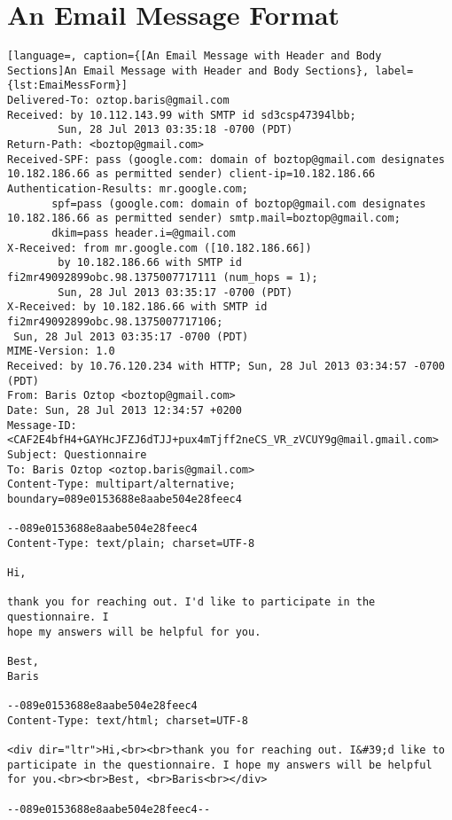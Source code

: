 \chapter{An Email Message Format}
\label{app:EmaiMessForm}

\textbf{}


\begin{lstlisting}[language=, caption={[An Email Message with Header and Body Sections]An Email Message with Header and Body Sections}, label={lst:EmaiMessForm}]
Delivered-To: oztop.baris@gmail.com
Received: by 10.112.143.99 with SMTP id sd3csp47394lbb;
        Sun, 28 Jul 2013 03:35:18 -0700 (PDT)
Return-Path: <boztop@gmail.com>
Received-SPF: pass (google.com: domain of boztop@gmail.com designates 10.182.186.66 as permitted sender) client-ip=10.182.186.66
Authentication-Results: mr.google.com;
       spf=pass (google.com: domain of boztop@gmail.com designates 10.182.186.66 as permitted sender) smtp.mail=boztop@gmail.com;
       dkim=pass header.i=@gmail.com
X-Received: from mr.google.com ([10.182.186.66])
        by 10.182.186.66 with SMTP id fi2mr49092899obc.98.1375007717111 (num_hops = 1);
        Sun, 28 Jul 2013 03:35:17 -0700 (PDT)
X-Received: by 10.182.186.66 with SMTP id fi2mr49092899obc.98.1375007717106;
 Sun, 28 Jul 2013 03:35:17 -0700 (PDT)
MIME-Version: 1.0
Received: by 10.76.120.234 with HTTP; Sun, 28 Jul 2013 03:34:57 -0700 (PDT)
From: Baris Oztop <boztop@gmail.com>
Date: Sun, 28 Jul 2013 12:34:57 +0200
Message-ID: <CAF2E4bfH4+GAYHcJFZJ6dTJJ+pux4mTjff2neCS_VR_zVCUY9g@mail.gmail.com>
Subject: Questionnaire
To: Baris Oztop <oztop.baris@gmail.com>
Content-Type: multipart/alternative; boundary=089e0153688e8aabe504e28feec4

--089e0153688e8aabe504e28feec4
Content-Type: text/plain; charset=UTF-8

Hi,

thank you for reaching out. I'd like to participate in the questionnaire. I
hope my answers will be helpful for you.

Best,
Baris

--089e0153688e8aabe504e28feec4
Content-Type: text/html; charset=UTF-8

<div dir="ltr">Hi,<br><br>thank you for reaching out. I&#39;d like to participate in the questionnaire. I hope my answers will be helpful for you.<br><br>Best, <br>Baris<br></div>

--089e0153688e8aabe504e28feec4--
\end{lstlisting}